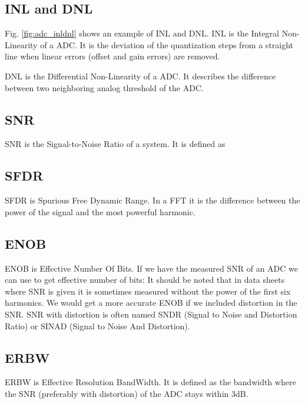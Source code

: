 \subsection{INL and DNL}
Fig. \ref{fig:adc_inldnl} shows an example of INL and DNL.
INL is the Integral Non-Linearity of a ADC. It is the deviation
of the quantization steps from a straight line when linear errors
(offset and gain errors) are removed. 

DNL is the Differential Non-Linearity of a ADC. It describes the
difference between two neighboring analog threshold of the ADC.



\subsection{SNR}
SNR is the Signal-to-Noise Ratio of a system. It is defined as

\subsection{SFDR}
SFDR is Spurious Free Dynamic Range. In a FFT it is the
difference between the power of the signal and the most powerful
harmonic.

\subsection{ENOB}
ENOB is Effective Number Of Bits. If we have the measured SNR of an
ADC we can use  to get effective number of bits:
It should be noted that in data sheets where SNR is given it is sometimes
measured without the power of the first six harmonics. We would get a more accurate
ENOB if we included distortion in the SNR. SNR with distortion is
often named SNDR (Signal to Noise and Distortion Ratio) or SINAD
(Signal to Noise And Distortion).

\subsection{ERBW}
ERBW is Effective Resolution BandWidth. It is defined as the bandwidth
where the SNR (preferably with distortion) of the ADC stays within 3dB. 


